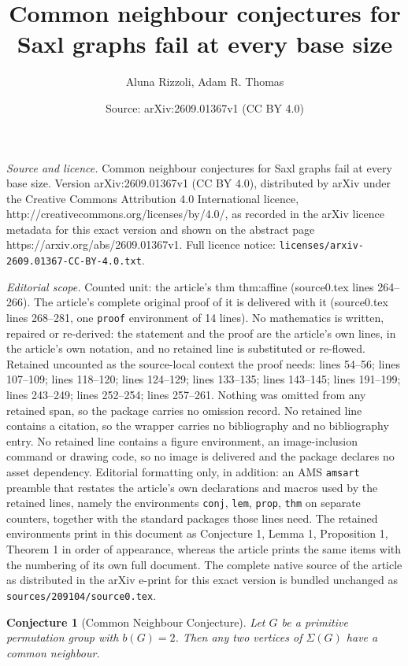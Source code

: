 \documentclass[10pt,a4paper]{amsart}
\title{Common neighbour conjectures for Saxl graphs fail at every base size}
\author{Aluna Rizzoli, Adam R. Thomas}
\date{Source: arXiv:2609.01367v1 (CC BY 4.0)}
\newtheorem{conj}{Conjecture}
\begin{document}
\maketitle

\noindent\emph{Source and licence.} Common neighbour conjectures for Saxl graphs fail at every base size. Version arXiv:2609.01367v1 (CC BY 4.0), distributed by arXiv under the Creative Commons Attribution 4.0 International licence, http://creativecommons.org/licenses/by/4.0/, as recorded in the arXiv licence metadata for this exact version and shown on the abstract page https://arxiv.org/abs/2609.01367v1. Full licence notice: \texttt{licenses/arxiv-2609.01367-CC-BY-4.0.txt}.\par\smallskip

\noindent\textit{Editorial scope.} Counted unit: the article's thm thm:affine (source0.tex lines 264--266). The article's complete original proof of it is delivered with it (source0.tex lines 268--281, one \texttt{proof} environment of 14 lines). No mathematics is written, repaired or re-derived: the statement and the proof are the article's own lines, in the article's own notation, and no retained line is substituted or re-flowed.  Retained uncounted as the source-local context the proof needs: lines 54--56; lines 107--109; lines 118--120; lines 124--129; lines 133--135; lines 143--145; lines 191--199; lines 243--249; lines 252--254; lines 257--261.  Nothing was omitted from any retained span, so the package carries no omission record.  No retained line contains a citation, so the wrapper carries no bibliography and no bibliography entry.  No retained line contains a figure environment, an image-inclusion command or drawing code, so no image is delivered and the package declares no asset dependency.  Editorial formatting only, in addition: an AMS \texttt{amsart} preamble that restates the article's own declarations and macros used by the retained lines, namely the environments \texttt{conj}, \texttt{lem}, \texttt{prop}, \texttt{thm} on separate counters, together with the standard packages those lines need.  The retained environments print in this document as Conjecture 1, Lemma 1, Proposition 1, Theorem 1 in order of appearance, whereas the article prints the same items with the numbering of its own full document.  The complete native source of the article as distributed in the arXiv e-print for this exact version is bundled unchanged as \texttt{sources/209104/source0.tex}.
\begin{conj}[Common Neighbour Conjecture]\label{bgconj}
Let $G$ be a primitive permutation group with $b(G)=2$. Then any two vertices of $\Sigma(G)$ have a common neighbour.
\end{conj}
\end{document}
